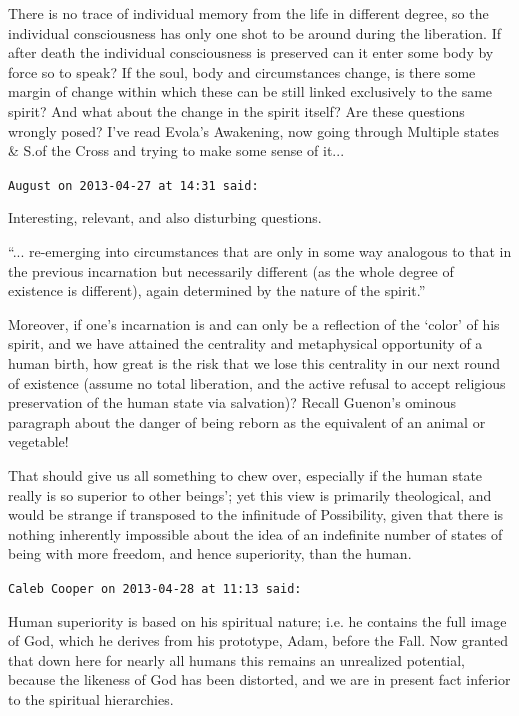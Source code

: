 \begin{footnotesize}
\begin{sffamily}
There is no trace of individual memory from the life in different degree, so the individual consciousness has only one shot to be around during the liberation. If after death the individual consciousness is preserved can it enter some body by force so to speak? If the soul, body and circumstances change, is there some margin of change within which these can be still linked exclusively to the same spirit? And what about the change in the spirit itself? Are these questions wrongly posed? I've read Evola's Awakening, now going through Multiple states \& S.of the Cross and trying to make some sense of it... 

\hfill

\texttt{August on 2013-04-27 at 14:31 said:}

Interesting, relevant, and also disturbing questions.

``... re-emerging into circumstances that are only in some way analogous to that in the previous incarnation but necessarily different (as the whole degree of existence is different), again determined by the nature of the spirit.''

Moreover, if one's incarnation is and can only be a reflection of the `color' of his spirit, and we have attained the centrality and metaphysical opportunity of a human birth, how great is the risk that we lose this centrality in our next round of existence (assume no total liberation, and the active refusal to accept religious preservation of the human state via salvation)? Recall Guenon's ominous paragraph about the danger of being reborn as the equivalent of an animal or vegetable!

That should give us all something to chew over, especially if the human state really is so superior to other beings'; yet this view is primarily theological, and would be strange if transposed to the infinitude of Possibility, given that there is nothing inherently impossible about the idea of an indefinite number of states of being with more freedom, and hence superiority, than the human.

\hfill

\texttt{Caleb Cooper on 2013-04-28 at 11:13 said:}

Human superiority is based on his spiritual nature; i.e. he contains the full image of God, which he derives from his prototype, Adam, before the Fall. Now granted that down here for nearly all humans this remains an unrealized potential, because the likeness of God has been distorted, and we are in present fact inferior to the spiritual hierarchies.


\end{sffamily}
\end{footnotesize}
